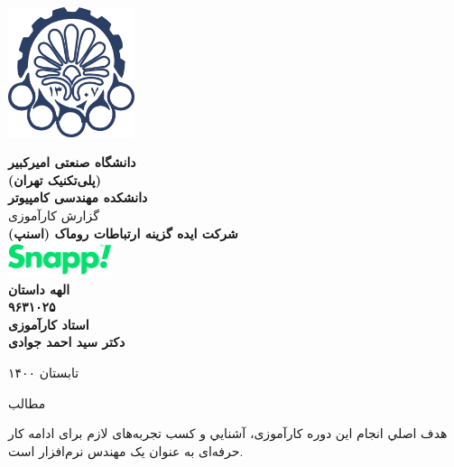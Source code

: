 \documentclass[a4]{report}
\begin{document}
\setLTRbibitems{}

\begin{titlepage}\begin{center}
    \vspace{1cm}
    \includegraphics[height=3.8cm]{fig/fa-logo}

    \vspace{1cm}
    {
        \bfseries{\large دانشگاه صنعتی امیرکبیر}\\
        \normalsize(پلی‌تکنیک تهران)\\
        \large دانشکده مهندسی کامپیوتر\\
    }
    \vspace{1cm}
    {
      \large
        گزارش کارآموزی\\
    }
    \vspace{1cm}
    {
      \bfseries\Large
      شرکت ایده گزینه ارتباطات روماک (اسنپ)\\
    }
    \vspace{0.8cm}
    \includegraphics[height=1cm]{fig/snapp}\\
    \vspace{0.8cm}
    {
      \bfseries\large
      الهه داستان\\
      ۹۶۳۱۰۲۵\\
    }
    \vspace{0.8cm}
    {
      \bfseries\large
      استاد کارآموزی\\
      دکتر سید احمد جوادی\\
    }



    \vfill
    {\fontsize{16pt}{17pt} تابستان ۱۴۰۰}
\end{center}\end{titlepage}
\newpage

‌مطالب

هدف اصلي انجام این دوره کارآموزی، آشنایي و کسب تجربه‌های لازم برای ادامه کار حرفه‌ای به
عنوان یک مهندس نرم‌افزار است.
\end{document}
